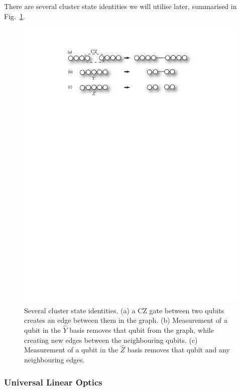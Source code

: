 \documentclass[aps,rmp,twocolumn,amsmath,amssymb,nofootinbib,superscriptaddress]{revtex4}
\begin{document}
There are several cluster state identities we will utilise later, summarised in Fig.~\ref{fig:cluster_ident}.

\begin{figure}
\includegraphics[width=\columnwidth]{cluster_identities}
\caption{Several cluster state identities. (a) a CZ gate between two qubits creates an edge between them in the graph. (b) Measurement of a qubit in the $\hat{Y}$ basis removes that qubit from the graph, while creating new edges between the neighbouring qubits. (c) Measurement of a qubit in the $\hat{Z}$ basis removes that qubit and any neighbouring edges.} \label{fig:cluster_ident} 
\end{figure}

%
%

\subsubsection{Universal Linear Optics} \label{sec:KLM_univ}
\end{document}
